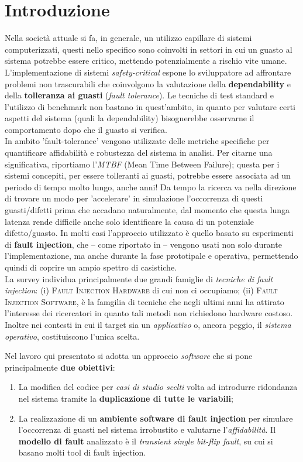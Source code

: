 \section{Introduzione}
Nella società attuale si fa, in generale, un utilizzo capillare di sistemi computerizzati, questi nello specifico sono coinvolti in settori in cui un guasto al sistema potrebbe essere critico, mettendo potenzialmente a rischio vite umane. L'implementazione di sistemi \textit{safety-critical} espone lo sviluppatore ad affrontare problemi non trascurabili che coinvolgono la valutazione della \textbf{dependability} \cite{noauthor_dependability_2024} e della \textbf{tolleranza ai guasti} (\textit{fault tolerance}). Le tecniche di test standard e l'utilizzo di benchmark non bastano in quest'ambito, in quanto per valutare certi aspetti del sistema (quali la dependability) bisognerebbe osservarne il comportamento dopo che il guasto si verifica. \\
In ambito 'fault-tolerance' vengono utilizzate delle metriche specifiche per quantificare affidabilità e robustezza del sistema in analisi. Per citarne una significativa, riportiamo l'\textit{MTBF} (Mean Time Between Failure); questa per i sistemi concepiti, per essere tolleranti ai guasti, potrebbe essere associata ad un periodo di tempo molto lungo, anche anni! Da tempo la ricerca va nella direzione di trovare un modo per 'accelerare' in simulazione l'occorrenza di questi guasti/difetti prima che accadano naturalmente, dal momento che questa lunga latenza rende difficile anche solo identificare la causa di un potenziale difetto/guasto. In molti casi l'approccio utilizzato è quello basato su esperimenti di \textbf{fault injection}, che -- come riportato in \cite{depend} -- vengono usati non solo durante l'implementazione, ma anche durante la fase prototipale e operativa, permettendo quindi di coprire un ampio spettro di casistiche.\\
La survey \cite{hsueh1997fault} individua principalmente due grandi famiglie di \textit{tecniche di fault injection}:
(i) \textsc{Fault Injection Hardware} di cui non ci occupiamo; (ii) \textsc{Fault Injection Software}, è la famgilia  di tecniche che negli ultimi anni ha attirato l'interesse dei ricercatori in quanto tali metodi non richiedono hardware costoso. Inoltre nei contesti in cui il target sia un \textit{applicativo} o, ancora peggio, il \textit{sistema operativo}, costituiscono l'unica scelta.

\noindent
Nel lavoro qui presentato si adotta un approccio \textit{software} che si pone principalmente \textbf{due obiettivi}: 
\begin{enumerate}
    \itemsep-0.3em
    \item La modifica del codice per \textit{casi di studio scelti} volta ad introdurre ridondanza nel sistema tramite la \textbf{duplicazione di tutte le variabili}; 
    \item La realizzazione di un \textbf{ambiente software di fault injection} per simulare l'occorrenza di guasti nel sistema irrobustito e valutarne l'\textit{affidabilità}. Il \textbf{modello di fault} analizzato è il \textit{transient single bit-flip fault}, su cui si basano molti tool di fault injection. 
\end{enumerate}

